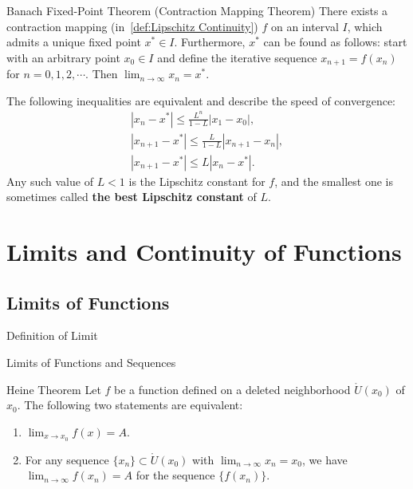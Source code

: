 \documentclass[11pt]{../../TexTemplate/elegantbook}
\begin{document}
\begin{theorem}{Banach Fixed-Point Theorem (Contraction Mapping Theorem)}\label{thm:Banach Fixed-Point Theorem}
    There exists a contraction mapping (in~\ref{def:Lipschitz Continuity}) \(f\) on an interval \(I\),
    which admits a unique fixed point \(x^{*}\in I\).
    Furthermore, \(x^{*}\) can be found as follows:
    start with an arbitrary point \(x_{0}\in I\) and define the iterative sequence
    \(x_{n+1}=f(x_n)\) for \(n=0,1,2,\cdots\).
    Then \(\lim_{n \to \infty} x_n = x^{*}\).
\end{theorem}

\begin{remark}
    The following inequalities are equivalent and describe the speed of convergence:  
    \begin{gather*}
        \left| x_{n} - x^{*} \right|  \leqslant \frac{L^{n}}{1-L} \left| x_{1} - x_{0} \right|, \\
        \left| x_{n+1} - x^{*} \right| \leqslant \frac{L}{1-L} \left| x_{n+1} - x_{n} \right|, \\
        \left| x_{n+1} - x^{*} \right| \leqslant L \left| x_{n} - x^{*} \right|.
    \end{gather*}
    Any such value of \(L<1\) is the Lipschitz constant for \(f\), 
    and the smallest one is sometimes called \textbf{the best Lipschitz constant} of \(L\).
\end{remark}



\chapter{Limits and Continuity of Functions}
\section{Limits of Functions}
\begin{leftbarTitle}{Definition of Limit}\end{leftbarTitle}

\begin{leftbarTitle}{Limits of Functions and Sequences}\end{leftbarTitle}
\begin{theorem}{Heine Theorem}\label{thm:Heine Theorem}
    Let \(f\) be a function defined on a deleted neighborhood \(\mathring{U}(x_{0})\) of \(x_{0}\).
    The following two statements are equivalent:
    \begin{enumerate}
        \item \(\lim_{x \to x_{0}} f(x) = A\).
        \item For any sequence \(\{x_n\}\subset \mathring{U}(x_{0})\) with \(\lim_{n \to \infty} x_n = x_0\),
            we have \(\lim_{n \to \infty} f(x_n) = A\) for the sequence \(\{f(x_n)\}\).
    \end{enumerate}
\end{theorem}
\end{document}
